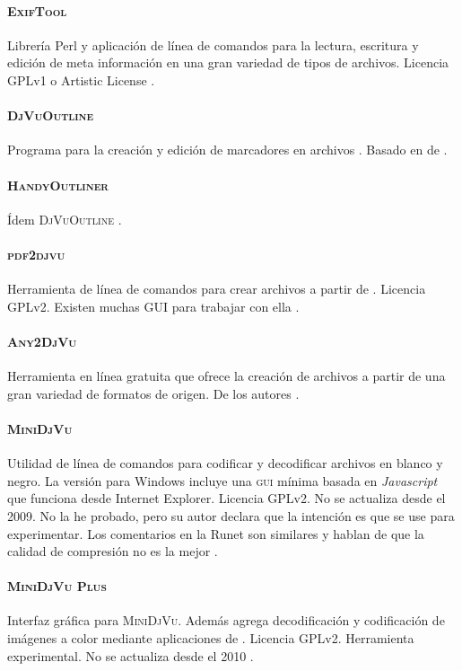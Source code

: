 \documentclass[%
	a5paper,
	10pt,
	twoside,
	openright,
	final,
]{memoir}
\begin{document}
{	\paragraph{\textsc{ExifTool}}Librería Perl y aplicación de línea de comandos para la lectura, escritura y edición de meta información en una gran variedad de tipos de archivos. Licencia GPLv1 o Artistic License \cite{ExifTool}.
	\paragraph{\textsc{DjVuOutline}} Programa para la creación y edición de marcadores en archivos \djvu. Basado en  de \djvulibre \cite{DjVuOutline}.
	\paragraph{\textsc{HandyOutliner}} Ídem \textsc{DjVuOutline} \cite{HandyOutliner}.
	\paragraph{\textsc{pdf2djvu}} Herramienta de línea de comandos para crear archivos \djvu a partir de \pdf. Licencia GPLv2. Existen muchas GUI para trabajar con ella \cite{pdf2djvu}.
	\paragraph{\textsc{Any2DjVu}} Herramienta en línea gratuita que ofrece la creación de archivos \djvu a partir de una gran variedad de formatos de origen. De los autores \djvulibre \cite{Any2DjVu}.
	\paragraph{\textsc{MiniDjVu}} Utilidad de línea de comandos para codificar y decodificar archivos \djvu en blanco y negro. La versión para Windows incluye una \textsc{gui} mínima basada en \emph{Javascript} que funciona desde Internet Explorer. Licencia GPLv2. No se actualiza desde el 2009. No la he probado, pero su autor declara que la intención es que se use para experimentar. Los comentarios en la Runet \cite{WikipediaRunet} son similares y hablan de que la calidad de compresión no es la mejor \cite{MiniDjVu}.
	\paragraph{\textsc{MiniDjVu Plus}} Interfaz gráfica para \textsc{MiniDjVu}. Además agrega decodificación y codificación de imágenes a color mediante aplicaciones de \djvulibre. Licencia GPLv2. Herramienta experimental. No se actualiza desde el 2010 \cite{MiniDjVuPlus}.
}
\end{document}
